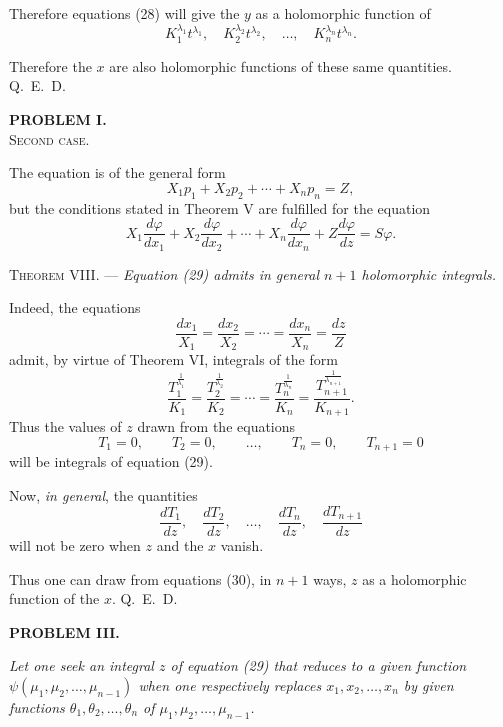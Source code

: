 \documentclass[11pt]{article}
\begin{document}
Therefore equations (28) will give the $y$ as a holomorphic function of
\[
K_1^{\lambda_1}t^{\lambda_1},\quad K_2^{\lambda_2}t^{\lambda_2},\quad \ldots,\quad K_n^{\lambda_n}t^{\lambda_n}.
\]

Therefore the $x$ are also holomorphic functions of these same quantities. \hfill\mbox{Q. E. D.}

\begin{center}
{\bfseries PROBLEM I.}\\[0.6em]
{\scshape Second case.}
\end{center}

The equation is of the general form
\begin{equation*}\tag{29}
X_1p_1+X_2p_2+\cdots+X_np_n=Z,
\end{equation*}
but the conditions stated in Theorem V are fulfilled for the equation
\[
X_1\frac{d\varphi}{dx_1}+X_2\frac{d\varphi}{dx_2}+\cdots+X_n\frac{d\varphi}{dx_n}+Z\frac{d\varphi}{dz}=S\varphi.
\]

\noindent\textsc{Theorem VIII.} --- \emph{Equation (29) admits in general $n+1$ holomorphic integrals.}

Indeed, the equations
\[
\frac{dx_1}{X_1}=\frac{dx_2}{X_2}=\cdots=\frac{dx_n}{X_n}=\frac{dz}{Z}
\]
admit, by virtue of Theorem VI, integrals of the form
\[
\frac{T_1^{\frac1{\lambda_1}}}{K_1}
=
\frac{T_2^{\frac1{\lambda_2}}}{K_2}
=\cdots=
\frac{T_n^{\frac1{\lambda_n}}}{K_n}
=
\frac{T_{n+1}^{\frac1{\lambda_{n+1}}}}{K_{n+1}}.
\]
Thus the values of $z$ drawn from the equations
\begin{equation*}\tag{30}
T_1=0,
\qquad
T_2=0,
\qquad \ldots,
\qquad
T_n=0,
\qquad
T_{n+1}=0
\end{equation*}
will be integrals of equation (29).

Now, \emph{in general}, the quantities
\[
\frac{dT_1}{dz},\quad \frac{dT_2}{dz},\quad \ldots,\quad \frac{dT_n}{dz},\quad \frac{dT_{n+1}}{dz}
\]
will not be zero when $z$ and the $x$ vanish.

Thus one can draw from equations (30), in $n+1$ ways, $z$ as a holomorphic function of the $x$. \hfill\mbox{Q. E. D.}

\begin{center}
{\bfseries PROBLEM III.}
\end{center}

\emph{Let one seek an integral $z$ of equation (29) that reduces to a given function $\psi(\mu_1,\mu_2,\ldots,\mu_{n-1})$ when one respectively replaces $x_1,x_2,\ldots,x_n$ by given functions $\theta_1,\theta_2,\ldots,\theta_n$ of $\mu_1,\mu_2,\ldots,\mu_{n-1}$.}
\end{document}

